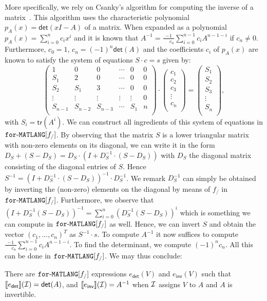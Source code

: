 More specifically, we rely on Csanky's algorithm for computing the inverse of a matrix~\cite{Csanky76}. This algorithm uses the characteristic
polynomial $p_A(x)=\mathsf{det}(xI-A)$ of a matrix. When expanded as a polynomial
$p_A(x)=\sum_{i=0}^{n} c_i x^i$ and it is known that $A^{-1}=\frac{-1}{\phantom{-1}c_n}\sum_{i=0}^{n-1}c_i A^{n-1-i}$
if $c_n\neq 0$. Furthermore, $c_0=1$, $c_n=(-1)^n\mathsf{det}(A)$ and the coefficients $c_i$ of $p_A(x)$
are known to satisfy the system of equations $S\cdot c=s$ given by:
$$
\left(\begin{matrix}
1 & 0 & 0 & \cdots & 0 & 0\\
S_1 & 2 & 0 & \cdots  &0 & 0\\
S_2 & S_1 & 3 & \cdots  &0 & 0\\
\vdots & \vdots & \vdots & \vdots & \vdots & 0\\
S_{n-1} & S_{n-2} & S_{n-3} & \cdots & S_1 & n\\
\end{matrix}\right)\cdot
\left(\begin{matrix}
c_1\\
c_2\\
c_3\\
\vdots\\
c_n\\
\end{matrix}\right)=\left(\begin{matrix}
S_1\\
S_2\\
S_3\\
\vdots\\
S_n\\
\end{matrix}\right),
$$
with $S_i=\mathsf{tr}(A^i)$. We can construct all ingredients of this system of equations in $\texttt{for}\text{-}\texttt{MATLANG}[f_/]$. By observing that the matrix $S$ is a lower triangular matrix with non-zero elements on its diagonal, we can write it in the form $D_S+(S-D_{S})=D_S\cdot(I+D_S^{-1}\cdot (S-D_S))$ with $D_S$ the diagonal matrix consisting of the diagonal entries of $S$.
Hence $S^{-1}=(I+D_{S}^{-1}\cdot(S-D_{S}))^{-1}\cdot D_S^{-1}$. 
We remark $D_S^{-1}$ can simply be obtained by inverting the (non-zero) elements on the diagonal by means of $f_/$ in $\texttt{for}\text{-}\texttt{MATLANG}[f_/]$. Furthermore, we observe that $(I+D_S^{-1}(S-D_S))^{-1}=\sum_{i=0}^{n}(D_S^{-1}(S-D_S))^i$ which is something
we can compute in $\texttt{for}\text{-}\texttt{MATLANG}[f_/]$ as well. Hence, we can invert $S$ and obtain the vector $(c_1,\ldots,c_n)^T$ as $S^{-1}\cdot s$. To compute $A^{-1}$ it now suffices to compute
$\frac{-1}{\phantom{-1}c_n}\sum_{i=0}^{n-1}c_i A^{n-1-i}$. To find the determinant,
we compute $(-1)^nc_n$. All this can be done in $\texttt{for}\text{-}\texttt{MATLANG}[f_/]$.
We may thus conclude:
\begin{proposition}\label{prop:inverse}
    There are $\texttt{for}\text{-}\texttt{MATLANG}[f_/]$ expressions $e_{\mathsf{det}}(V)$ and $e_{\mathsf{inv}}(V)$ such that
    $\llbracket e_{\mathsf{det}} \rrbracket(\mathcal{I})=\mathsf{det}(A)$, and  
    $\llbracket e_{\mathsf{inv}} \rrbracket(\mathcal{I})=A^{-1}$ when $\mathcal{I}$ assigns $V$
    to $A$ and $A$ is invertible.
\end{proposition}


